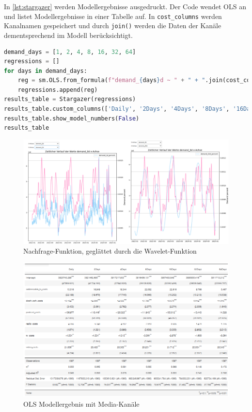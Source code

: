 In \autoref{lst:stargazer} werden Modellergebnisse ausgedruckt. Der Code wendet \ac{OLS} an und listet Modellergebnisse in einer Tabelle auf. In \verb|cost_columns| werden Kanalnamen gespeichert und durch \verb|join()| werden die Daten der Kanäle dementsprechend im Modell berücksichtigt. 
\begin{lstlisting}[language=Python, linewidth=\textwidth]
demand_days = [1, 2, 4, 8, 16, 32, 64]
regressions = []
for days in demand_days:
    reg = sm.OLS.from_formula(f"demand_{days}d ~ " + " + ".join(cost_columns), df_wlt_decomp).fit()
    regressions.append(reg)
results_table = Stargazer(regressions)
results_table.custom_columns(['Daily', '2Days', '4Days', '8Days', '16Days', '32Days', '64Days'], [1, 1, 1, 1, 1, 1, 1])
results_table.show_model_numbers(False)
results_table
\end{lstlisting}
\label{lst:stargazer}
\begin{figure}[H]
    \centering
    \includegraphics[width=1\linewidth]{images/wavelet.png}
    \caption{Nachfrage-Funktion, geglättet durch die Wavelet-Funktion}
    \label{fig:wavelet}
\end{figure}
\begin{figure}
    \centering
    \includegraphics[width=1\linewidth]{images/ols1.png}
    \caption{\ac{OLS} Modellergebnis mit Media-Kanäle}
    \label{fig:ols1}
\end{figure}
